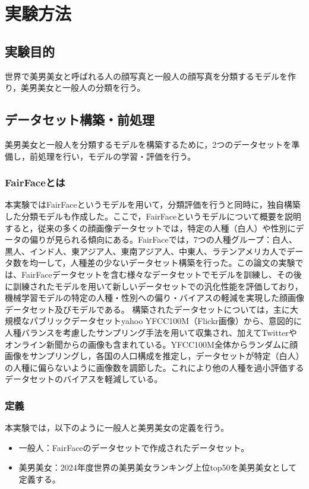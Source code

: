 \documentclass[a4paper,11pt,titlepage]{jsarticle}
\begin{document}
\section{実験方法}
\label{label:実験方法}
\subsection{実験目的}
世界で美男美女と呼ばれる人の顔写真と一般人の顔写真を分類するモデルを作り，美男美女と一般人の分類を行う。

\subsection{データセット構築・前処理}
美男美女と一般人を分類するモデルを構築するために，2つのデータセットを準備し，前処理を行い，モデルの学習・評価を行う。

\subsubsection{FairFaceとは}
本実験ではFairFaceというモデルを用いて，分類評価を行うと同時に，独自構築した分類モデルも作成した。ここで，FairFaceというモデルについて概要を説明すると，従来の多くの顔画像データセットでは，特定の人種（白人）や性別にデータの偏りが見られる傾向にある。FairFaceでは，7つの人種グループ：白人、黒人、インド人、東アジア人、東南アジア人、中東人、ラテンアメリカ人でデータ数を均一して，人種差の少ないデータセット構築を行った。この論文の実験では、FairFaceデータセットを含む様々なデータセットでモデルを訓練し、その後に訓練されたモデルを用いて新しいデータセットでの汎化性能を評価しており，機械学習モデルの特定の人種・性別への偏り・バイアスの軽減を実現した顔画像データセット及びモデルである。
構築されたデータセットについては，主に大規模なパブリックデータセットyahoo YFCC100M（Flickr画像）から、意図的に人種バランスを考慮したサンプリング手法を用いて収集され、加えてTwitterやオンライン新聞からの画像も含まれている。YFCC100M全体からランダムに顔画像をサンプリングし，各国の人口構成を推定し，データセットが特定（白人）の人種に偏らないように画像数を調節した。これにより他の人種を過小評価するデータセットのバイアスを軽減している。




\subsubsection{定義}
本実験では，以下のように一般人と美男美女の定義を行う。
\begin{itemize}
    \item 一般人：FairFaceのデータセットで作成されたデータセット。
    \item 美男美女：2024年度世界の美男美女ランキング上位top50を美男美女として定義する。
\end{itemize}
\end{document}
